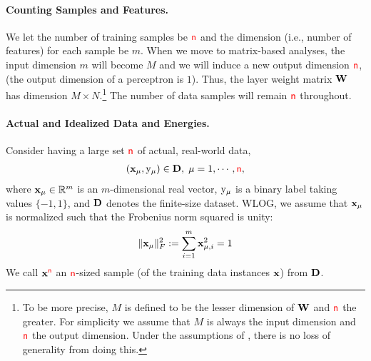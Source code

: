 \paragraph{Counting Samples and Features.}
We let the number of training samples be ${\color{red}\sf{n}}$ and the dimension 
(i.e., number of features) for each sample be $m$.
When we move to matrix-based analyses, 
the input dimension $m$ will become $M$ and we will induce a new output dimension ${\color{red}\sf{n}}$, (the output dimension of a perceptron is $1$). Thus, the layer weight matrix ${\mathbf{W}}$ has dimension $M\times N$.\footnote{To be more precise, $M$ is defined to be the lesser dimension of ${\mathbf{W}}$ and ${\color{red}\sf{n}}$ the greater. For simplicity we assume that $M$ is always the input dimension and ${\color{red}\sf{n}}$ the output dimension. Under the assumptions of \SETOL, there is no loss of generality from doing this.} The number of data samples will remain ${\color{red}\sf{n}}$ throughout.



\paragraph{Actual and Idealized Data and Energies.}

Consider having a large set ${\color{red}\sf{n}}$ of actual, real-world data, 
\begin{align}
  \label{eqn:x}
  \left( {\mathbf{x}}_{\mu}, \mathrm{y}_{\mu} \right) \in\mathbf{D},\;\mu=1, \cdots, {\color{red}\sf{n}},
\end{align}
where 
${\mathbf{x}}_{\mu}\in\mathbb{R}^{m}$ is an $m$-dimensional real vector, 
$\mathrm{y}_{\mu}$ is a binary label taking values $\{-1,1\}$, and 
$\mathbf{D}$ denotes the finite-size dataset.
WLOG, we assume that ${\mathbf{x}}_{\mu}$ is normalized such that the Frobenius norm squared is unity:
\begin{equation}
  \label{eqn:XVEC_norm}
  \Vert{\mathbf{x}}_{\mu}\Vert^{2}_{F} := \sum_{i=1}^{m} {\mathbf{x}}_{\mu,i}^{2}=1
\end{equation}
We call ${\mathbf{x}}^{{\color{red}\sf{n}}}$ an ${\color{red}\sf{n}}$-sized sample (of the training data instances ${\mathbf{x}}$) from $\mathbf{D}$. 

